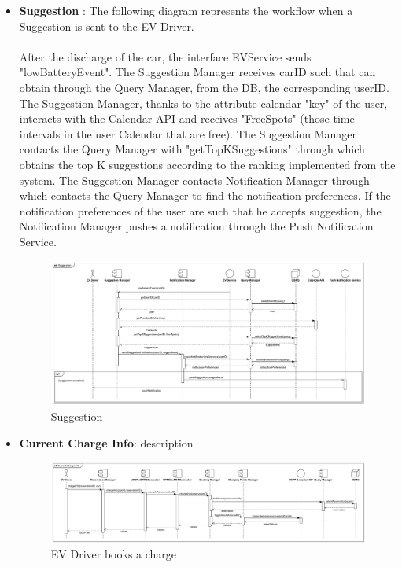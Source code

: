 \begin{itemize}
    \item \textbf{Suggestion} : The following diagram represents the workflow when a Suggestion is sent to the EV Driver.\\
          \\After the discharge of the car, the interface EVService sends "lowBatteryEvent".
          The Suggestion Manager receives carID such that can obtain through the Query Manager, from the DB, the corresponding userID.
          The Suggestion Manager, thanks to the attribute calendar "key" of the user, interacts with the Calendar API and receives "FreeSpots" (those
          time intervals in the user Calendar that are free).
          The Suggestion Manager contacts the Query Manager with "getTopKSuggestions" through which obtains the top K suggestions according
          to the ranking implemented from the system.
          The Suggestion Manager contacts Notification Manager through which contacts the Query Manager to find the notification preferences.
          If the notification preferences of the user are such that he accepts suggestion, the Notification Manager pushes a notification through the Push Notification Service.
          \\
          \begin{figure}[H]
              \centering
              \hspace*{-2cm}
              \includegraphics[scale=0.48]{src/runtimeView/eMSP_Suggestion.pdf}
              \caption{Suggestion}
          \end{figure}

    \item \textbf{Current Charge Info}: description
          \\\begin{figure}[H]
              \centering
              \hspace*{-2cm}
              \includegraphics[scale=0.44]{src/runtimeView/eMSP_currentChargeInfo.pdf}
              \caption{EV Driver books a charge}
          \end{figure}
\end{itemize}

